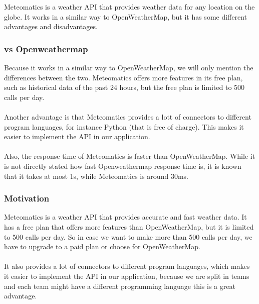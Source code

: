 \documentclass[../paper.tex]{subfiles}
\begin{document}
    Meteomatics is a weather API that provides weather data for any location on the globe.
    It works in a similar way to OpenWeatherMap, but it has some different advantages and disadvantages.

    \subsubsection{vs Openweathermap}
    Because it works in a similar way to OpenWeatherMap, we will only mention the differences between the two.
    Meteomatics offers more features in its free plan, such as historical data of the past 24 hours, but the free plan is limited to 500 calls per day.
    \\\\
    Another advantage is that Meteomatics provides a lott of connectors to different program languages, for instance Python (that is free of charge)\cite{c1}.
    This makes it easier to implement the API in our application.
    \\\\
    Also, the response time of Meteomatics is faster than OpenWeatherMap.
    While it is not directly stated how fast Openweathermap response time is, it is known that it takes at most 1s, while Meteomatics is around 30ms.

    \subsubsection{Motivation}
    Meteomatics is a weather API that provides accurate and fast weather data.
    It has a free plan that offers more features than OpenWeatherMap, but it is limited to 500 calls per day.
    So in case we want to make more than 500 calls per day, we have to upgrade to a paid plan or choose for OpenWeatherMap.
    \\\\
    It also provides a lot of connectors to different program languages, which makes it easier to implement the API in our application,
    because we are split in teams and each team might have a different programming language this is a great advantage.
\end{document}
